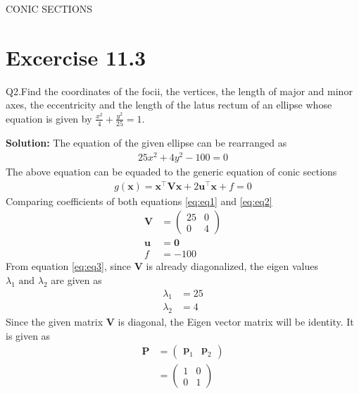 \documentclass[12pt]{article}
\providecommand{\brak}[1]{\ensuremath{\left(#1\right)}}
\newcommand{\solution}{\noindent \textbf{Solution: }}
\newcommand{\myvec}[1]{\ensuremath{\begin{pmatrix}#1\end{pmatrix}}}
\let\vec\mathbf
\begin{document}
\begin{center}
\textbf\large{CONIC SECTIONS}

\end{center}
\section*{Excercise 11.3}
Q2.Find the coordinates of the focii, the vertices, the length of major and minor axes, the eccentricity and the length of the latus rectum of an ellipse whose equation is given by $\frac{x^2}{4}+\frac{y^2}{25}=1$.

\solution
The equation of the given ellipse can be rearranged as 
\begin{align}
	\label{eq:eq1}
	25x^2+4y^2-100=0
\end{align}
The above equation can be equaded to the generic equation of conic sections
\begin{align}
	\label{eq:eq2}
	g\brak{\vec{x}}=\vec{x}^\top \vec{V} \vec{x} + 2\vec{u}^\top \vec{x} + f = 0
\end{align}
Comparing coefficients of both equations \eqref{eq:eq1} and \eqref{eq:eq2}
\begin{align}
	\label{eq:eq3}
	\vec{V} &= \myvec{25&0\\0&4}\\
	\vec{u} &= \vec{0}\\
	f &= -100
\end{align}
From equation \eqref{eq:eq3}, since $\vec{V}$ is already diagonalized, the eigen values $\lambda_1 \text{ and } \lambda_2$ are given as
\begin{align}
	\lambda_1 &= 25\\
	\lambda_2 &= 4
\end{align}
Since the given matrix $\vec{V}$ is diagonal, the Eigen vector matrix will be identity. It is given as
\begin{align}
	\vec{P} &= \myvec{\vec{p}_1 & \vec{p}_2}\\
		&= \myvec{1&0\\0&1}
\end{align}
\end{document}
